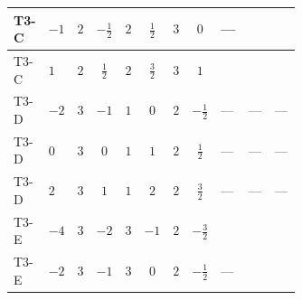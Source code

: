 \documentclass[8pt]{article}
\begin{document}
\begin{landscape}
\begin{longtable}{@{}llcccccc >{\raggedright\arraybackslash}p{0.21\linewidth} >{\raggedright\arraybackslash}p{0.21\linewidth} >{\raggedright\arraybackslash}p{0.21\linewidth}@{}}
\midrule
T3-C & $-1$ & $2$ & $-\frac{1}{2}$ & $2$ & $\frac{1}{2}$ & $3$ & $0$ & --- & \scriptsize\adjustbox{max width=\linewidth}{$\begin{gathered} -9 {g_2}^2 {\lambda_{12}^{(A)}}\end{gathered}$} & \scriptsize\adjustbox{max width=\linewidth}{$\begin{gathered} +8 {\lambda_{12}^{(1)}} {\lambda_{12}^{(A)}}\end{gathered}$} \\
\midrule
T3-C & $1$ & $2$ & $\frac{1}{2}$ & $2$ & $\frac{3}{2}$ & $3$ & $1$ & \scriptsize\adjustbox{max width=\linewidth}{$\begin{gathered} +{g_1}^2 \left(18 {g_2}^2-15 {\lambda_{12}^{(A)}}\right)\end{gathered}$} & \scriptsize\adjustbox{max width=\linewidth}{$\begin{gathered} -9 {g_2}^2 {\lambda_{12}^{(A)}}\end{gathered}$} & \scriptsize\adjustbox{max width=\linewidth}{$\begin{gathered} +8 {\lambda_{12}^{(1)}} {\lambda_{12}^{(A)}}\end{gathered}$} \\
\midrule
T3-D & $-2$ & $3$ & $-1$ & $1$ & $0$ & $2$ & $-\frac{1}{2}$ & --- & --- & --- \\
\midrule
T3-D & $0$ & $3$ & $0$ & $1$ & $1$ & $2$ & $\frac{1}{2}$ & --- & --- & --- \\
\midrule
T3-D & $2$ & $3$ & $1$ & $1$ & $2$ & $2$ & $\frac{3}{2}$ & --- & --- & --- \\
\midrule
T3-E & $-4$ & $3$ & $-2$ & $3$ & $-1$ & $2$ & $-\frac{3}{2}$ & \scriptsize\adjustbox{max width=\linewidth}{$\begin{gathered} +{g_1}^2 \left(16 {g_2}^2-30 {\lambda_{12}^{(A)}}\right)\end{gathered}$} & \scriptsize\adjustbox{max width=\linewidth}{$\begin{gathered} -24 {g_2}^2 {\lambda_{12}^{(A)}}\end{gathered}$} & \scriptsize\adjustbox{max width=\linewidth}{$\begin{gathered} +8 {\lambda_{12}^{(1)}} {\lambda_{12}^{(A)}}\end{gathered}$} \\
\midrule
T3-E & $-2$ & $3$ & $-1$ & $3$ & $0$ & $2$ & $-\frac{1}{2}$ & --- & \scriptsize\adjustbox{max width=\linewidth}{$\begin{gathered} -24 {g_2}^2 {\lambda_{12}^{(A)}}\end{gathered}$} & \scriptsize\adjustbox{max width=\linewidth}{$\begin{gathered} +8 {\lambda_{12}^{(1)}} {\lambda_{12}^{(A)}}\end{gathered}$} \\

\end{longtable}
\end{landscape}
\end{document}
